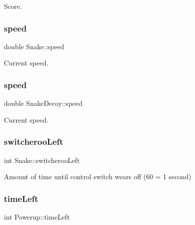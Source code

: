 Score. 

\mbox{\label{group__snake_ga203349d9342db170b9745c3da26dbcbe}} 
\subsubsection{\texorpdfstring{speed}{speed}\hspace{0.1cm}{\footnotesize\ttfamily [1/2]}}
{\footnotesize\ttfamily double Snake\+::speed}



Current speed. 

\mbox{\label{group__snake_gac676e96d99b1a684120e6cf048e2e6c0}} 
\subsubsection{\texorpdfstring{speed}{speed}\hspace{0.1cm}{\footnotesize\ttfamily [2/2]}}
{\footnotesize\ttfamily double Snake\+Decoy\+::speed}



Current speed. 

\mbox{\label{group__snake_ga66233a102458e305c73cbfdb6d40100f}} 
\subsubsection{\texorpdfstring{switcheroo\+Left}{switcherooLeft}}
{\footnotesize\ttfamily int Snake\+::switcheroo\+Left}



Amount of time until control switch wears off (60 = 1 second) 

\mbox{\label{group__snake_ga2de87d12a63bc12e8738adcada2d4ae4}} 
\subsubsection{\texorpdfstring{time\+Left}{timeLeft}}
{\footnotesize\ttfamily int Powerup\+::time\+Left}



